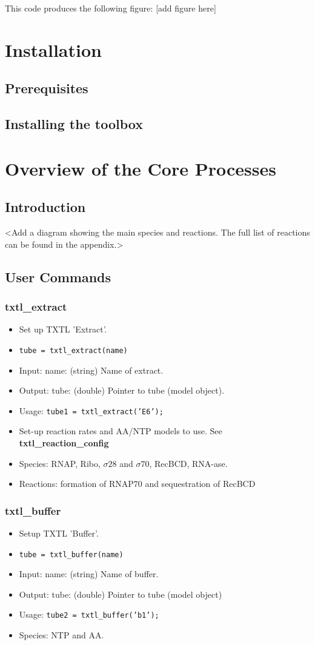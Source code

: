 \documentclass[english]{report}
\begin{document}
\noindent This code produces the following figure: [add figure here]


\chapter{Installation}
	\section{Prerequisites}
	\section{Installing the toolbox}
	
\chapter{Overview of the Core Processes}
	\section{Introduction}
	<Add a diagram showing the main species and reactions. The full list of reactions can be found in the appendix.>
	\section{User Commands}		
		\subsection*{txtl\_extract}
			\begin{itemize}
			\item Set up TXTL 'Extract'.
			\item \texttt{tube = txtl\_extract(name)}
			\item Input: name: (string) Name of extract. 
			\item Output: tube: (double) Pointer to tube (model object).
			\item Usage: \texttt{tube1 = txtl\_extract('E6');}
			\item Set-up reaction rates and AA/NTP models to use. See \textbf{txtl\_reaction\_config}
			\item Species: RNAP, Ribo, $\sigma 28$ and $\sigma 70$, RecBCD, RNA-ase.
			\item Reactions: formation of RNAP70 and sequestration of RecBCD
			\end{itemize}
		\subsection*{txtl\_buffer}
			\begin{itemize}
			\item Setup TXTL 'Buffer'.
			\item \texttt{tube = txtl\_buffer(name)}
			\item Input: name: (string) Name of buffer.
			\item Output: tube: (double) Pointer to tube (model object) 
			\item Usage: \texttt{tube2 = txtl\_buffer('b1');}
			\item Species: NTP and AA. 
			\end{itemize}			
\end{document}
